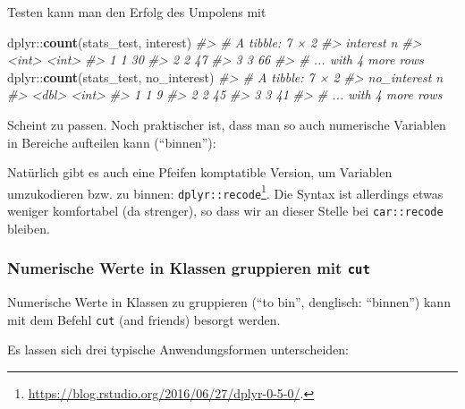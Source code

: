 \documentclass[12pt,]{book}
\makeatletter
\newenvironment{Shaded}{\begin{snugshade}}{\end{snugshade}}
\newcommand{\KeywordTok}[1]{\textcolor[rgb]{0.13,0.29,0.53}{\textbf{{#1}}}}
\newcommand{\StringTok}[1]{\textcolor[rgb]{0.31,0.60,0.02}{{#1}}}
\newcommand{\CommentTok}[1]{\textcolor[rgb]{0.56,0.35,0.01}{\textit{{#1}}}}
\newcommand{\NormalTok}[1]{{#1}}
\newenvironment{kframe}{%
\medskip{}
\setlength{\fboxsep}{.8em}
 \def\at@end@of@kframe{}%
 \ifinner\ifhmode%
  \def\at@end@of@kframe{\end{minipage}}%
  \begin{minipage}{\columnwidth}%
 \fi\fi%
 \def\FrameCommand##1{\hskip\@totalleftmargin \hskip-\fboxsep
 \colorbox{shadecolor}{##1}\hskip-\fboxsep
     \hskip-\linewidth \hskip-\@totalleftmargin \hskip\columnwidth}%
 \MakeFramed {\advance\hsize-\width
   \@totalleftmargin\z@ \linewidth\hsize
   \@setminipage}}%
 {\par\unskip\endMakeFramed%
 \at@end@of@kframe}
\renewenvironment{Shaded}{\begin{kframe}}{\end{kframe}}
\makeatother
\begin{document}
Testen kann man den Erfolg des Umpolens mit

\begin{Shaded}
\begin{Highlighting}[]
\NormalTok{dplyr::}\KeywordTok{count}\NormalTok{(stats_test, interest)}
\CommentTok{#> # A tibble: 7 × 2}
\CommentTok{#>   interest     n}
\CommentTok{#>      <int> <int>}
\CommentTok{#> 1        1    30}
\CommentTok{#> 2        2    47}
\CommentTok{#> 3        3    66}
\CommentTok{#> # ... with 4 more rows}
\NormalTok{dplyr::}\KeywordTok{count}\NormalTok{(stats_test, no_interest)}
\CommentTok{#> # A tibble: 7 × 2}
\CommentTok{#>   no_interest     n}
\CommentTok{#>         <dbl> <int>}
\CommentTok{#> 1           1     9}
\CommentTok{#> 2           2    45}
\CommentTok{#> 3           3    41}
\CommentTok{#> # ... with 4 more rows}
\end{Highlighting}
\end{Shaded}

Scheint zu passen. Noch praktischer ist, dass man so auch numerische
Variablen in Bereiche aufteilen kann (``binnen''):

\begin{Shaded}
\end{Shaded}

Natürlich gibt es auch eine Pfeifen komptatible Version, um Variablen
umzukodieren bzw. zu binnen: \texttt{dplyr::recode}\footnote{\url{https://blog.rstudio.org/2016/06/27/dplyr-0-5-0/}.}.
Die Syntax ist allerdings etwas weniger komfortabel (da strenger), so
dass wir an dieser Stelle bei \texttt{car::recode} bleiben.

\subsubsection{\texorpdfstring{Numerische Werte in Klassen gruppieren
mit
\texttt{cut}}{Numerische Werte in Klassen gruppieren mit cut}}\label{numerische-werte-in-klassen-gruppieren-mit-cut}

Numerische Werte in Klassen zu gruppieren (``to bin'', denglisch:
``binnen'') kann mit dem Befehl \texttt{cut} (and friends) besorgt
werden.

Es lassen sich drei typische Anwendungsformen unterscheiden:
\end{document}
